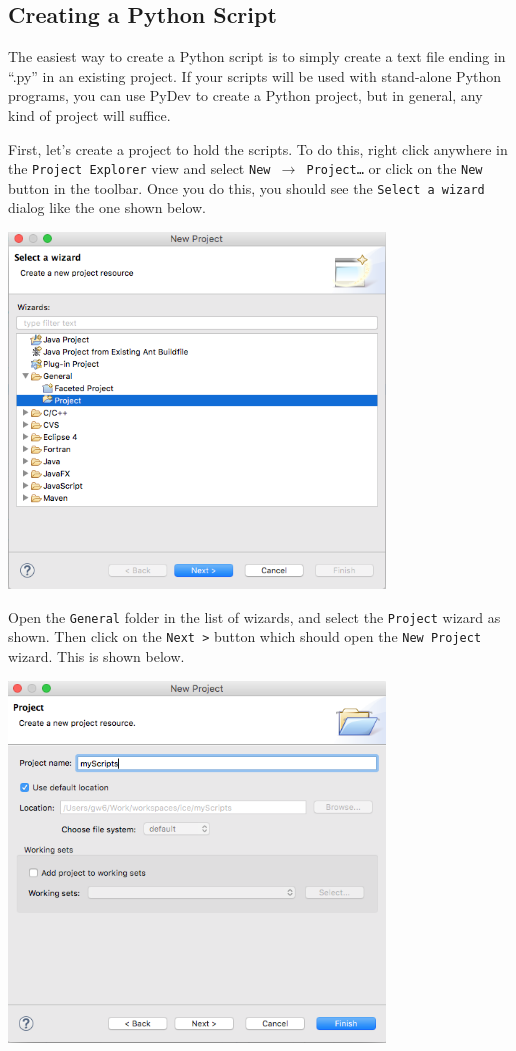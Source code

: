\subsection{Creating a Python Script}

The easiest way to create a Python script is to simply create a text file ending
in ``.py'' in an existing project. If your scripts will be used with stand-alone Python
programs, you can use PyDev to create a Python project, but in general, any kind
of project will suffice.

First, let's create a project to hold the scripts. To do this, right click
anywhere in the \texttt{Project Explorer} view and select \texttt{New
$\rightarrow$ Project\ldots} or click on the \texttt{New} button in the toolbar. Once you do
this, you should see the \texttt{Select a wizard} dialog like the one shown below.

\begin{center}
\includegraphics[width=10cm]{images/newproject}
\end{center}

Open the \texttt{General} folder in the list of wizards, and select the \texttt{Project}
wizard as shown. Then click on the \texttt{Next \textgreater} button which
should open the \texttt{New Project} wizard. This is shown below.

\begin{center}
\includegraphics[width=10cm]{images/newproject_wiz}
\end{center}

